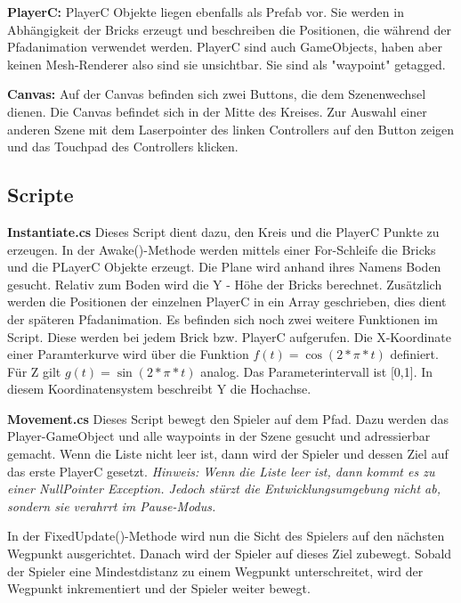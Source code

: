 \textbf{PlayerC: } PlayerC Objekte liegen ebenfalls als Prefab vor. Sie werden in Abhängigkeit der Bricks erzeugt und beschreiben die Positionen, die während der Pfadanimation verwendet werden. PlayerC sind auch GameObjects, haben aber keinen Mesh-Renderer also sind sie unsichtbar. Sie sind als "waypoint" getagged.

\textbf{Canvas: } Auf der Canvas befinden sich zwei Buttons, die dem Szenenwechsel dienen. Die Canvas befindet sich in der Mitte des Kreises. Zur Auswahl einer anderen Szene mit dem Laserpointer des linken Controllers auf den Button zeigen und das Touchpad des Controllers klicken. 


\subsection{Scripte}
\label{Circle_Scripts}


\textbf{Instantiate.cs}
Dieses Script dient dazu, den Kreis und die PlayerC Punkte zu erzeugen. In der Awake()-Methode werden mittels einer For-Schleife
die Bricks und die PLayerC Objekte erzeugt. Die Plane wird anhand ihres Namens \glqq Boden{}\grqq{} gesucht. Relativ zum Boden wird die Y - Höhe der Bricks berechnet.
Zusätzlich werden die Positionen der einzelnen PlayerC in ein Array geschrieben, dies dient der späteren Pfadanimation.
Es befinden sich noch zwei weitere Funktionen im Script. Diese werden bei jedem Brick bzw. PlayerC aufgerufen. Die X-Koordinate einer Paramterkurve wird über die Funktion $ f(t) = \cos(2 * \pi * t) $ definiert. Für Z gilt $g(t) = \sin(2 * \pi * t)$ analog. Das Parameterintervall ist [0,1]. In diesem Koordinatensystem beschreibt Y die Hochachse.


\textbf{Movement.cs}
Dieses Script bewegt den Spieler auf dem Pfad. Dazu werden das Player-GameObject und alle waypoints in der Szene gesucht und adressierbar gemacht.
Wenn die Liste nicht leer ist, dann wird der Spieler und dessen Ziel auf das erste PlayerC gesetzt. 
\emph{Hinweis: Wenn die Liste leer ist, dann kommt es zu einer NullPointer Exception. Jedoch stürzt die Entwicklungsumgebung nicht ab, sondern sie verahrrt im Pause-Modus.}

In der FixedUpdate()-Methode wird nun die Sicht des Spielers auf den nächsten Wegpunkt ausgerichtet. Danach wird der Spieler auf dieses Ziel zubewegt. Sobald der Spieler eine Mindestdistanz zu einem Wegpunkt unterschreitet, wird der Wegpunkt inkrementiert und der Spieler weiter bewegt.

